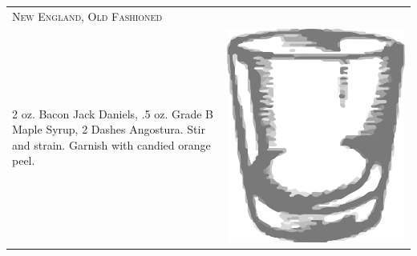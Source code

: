 \documentclass{article}
\begin{document}
\begin{multicols}{2}
\begin{tabular}{p{2in} p{0.5in}}
\multicolumn{2}{p{3in}}{\centering\Huge\textsc{New England, Old Fashioned}} \\ 
   \vspace{-0.1in}2 oz. Bacon Jack Daniels, .5 oz. Grade B Maple Syrup, 2 Dashes Angostura. Stir and strain. Garnish with candied orange peel. &
  \vspace{-0.1in} \includegraphics{rocks_glass.png}
\end{tabular}


\end{multicols}
\end{document}
